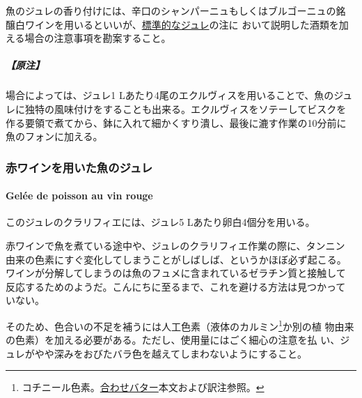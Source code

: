 \begin{recette}
魚のジュレの香り付けには、辛口のシャンパーニュもしくはブルゴーニュの銘
醸白ワインを用いるといいが、\protect\hyperlink{gelees-ordinaires}{標準的なジュレ}の注に
おいて説明した酒類を加える場合の注意事項を勘案すること。

\hypertarget{ux539fux6ce8-2}{%
\subparagraph{【原注】}\label{ux539fux6ce8-2}}

場合によっては、ジュレ1 Lあたり4尾のエクルヴィスを用いることで、魚のジュ
レに独特の風味付けをすることも出来る。エクルヴィスをソテーしてビスクを
作る要領で煮てから、鉢に入れて細かくすり潰し、最後に漉す作業の10分前に
魚のフォンに加える。

\maeaki

\hypertarget{ux8d64ux30efux30a4ux30f3ux3092ux7528ux3044ux305fux9b5aux306eux30b8ux30e5ux30ec}{%
\subsubsection{赤ワインを用いた魚のジュレ}\label{ux8d64ux30efux30a4ux30f3ux3092ux7528ux3044ux305fux9b5aux306eux30b8ux30e5ux30ec}}

\hypertarget{gelee-de-poisson-au-vin-rouge}{%
\paragraph{Gelée de poisson au vin
rouge}\label{gelee-de-poisson-au-vin-rouge}}


このジュレのクラリフィエには、ジュレ5 Lあたり卵白4個分を用いる。

赤ワインで魚を煮ている途中や、ジュレのクラリフィエ作業の際に、タンニン
由来の色素にすぐ変化してしまうことがしばしば、というかほぼ必ず起こる。
ワインが分解してしまうのは魚のフュメに含まれているゼラチン質と接触して
反応するためのようだ。こんにちに至るまで、これを避ける方法は見つかって
いない。

そのため、色合いの不足を補うには人工色素（液体のカルミン\footnote{コチニール色素。\protect\hyperlink{beurres-composes}{合わせバター}本文および訳注参照。}か別の植
物由来の色素）を加える必要がある。ただし、使用量にはごく細心の注意を払
い、ジュレがやや深みをおびたバラ色を越えてしまわないようにすること。
\end{recette}